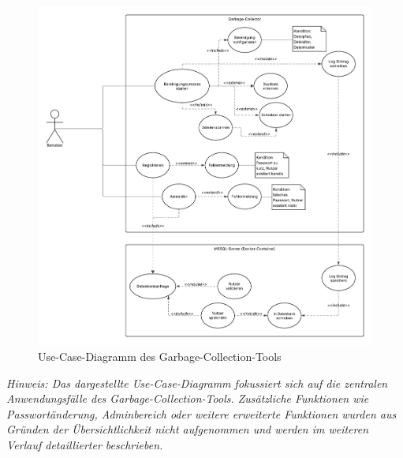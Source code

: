 
\begin{figure}[H]
    \centering
    \includegraphics[width=\textwidth]{src/usecase_diagramm.pdf} 
    \caption{Use-Case-Diagramm des Garbage-Collection-Tools}
\end{figure}

\vspace{-0.5em}
\begin{footnotesize}
\textit{Hinweis: Das dargestellte Use-Case-Diagramm fokussiert sich auf die zentralen Anwendungsfälle des Garbage-Collection-Tools. Zusätzliche Funktionen wie Passwortänderung, Adminbereich oder weitere erweiterte Funktionen wurden aus Gründen der Übersichtlichkeit nicht aufgenommen und werden im weiteren Verlauf detaillierter beschrieben.}
\end{footnotesize}


\label{sec:usecases}

